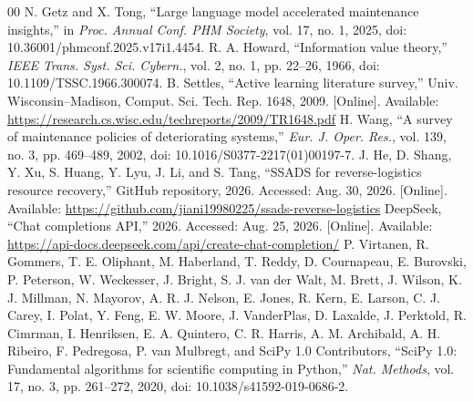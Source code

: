 \documentclass[a4paper,conference]{IEEEtran}
\begin{document}
\begin{thebibliography}{00}
 N. Getz and X. Tong, ``Large language model accelerated maintenance insights,'' in \emph{Proc. Annual Conf. PHM Society}, vol. 17, no. 1, 2025, doi: 10.36001/phmconf.2025.v17i1.4454.
 R. A. Howard, ``Information value theory,'' \emph{IEEE Trans. Syst. Sci. Cybern.}, vol. 2, no. 1, pp. 22--26, 1966, doi: 10.1109/TSSC.1966.300074.
 B. Settles, ``Active learning literature survey,'' Univ. Wisconsin--Madison, Comput. Sci. Tech. Rep. 1648, 2009. [Online]. Available: \url{https://research.cs.wisc.edu/techreports/2009/TR1648.pdf}
 H. Wang, ``A survey of maintenance policies of deteriorating systems,'' \emph{Eur. J. Oper. Res.}, vol. 139, no. 3, pp. 469--489, 2002, doi: 10.1016/S0377-2217(01)00197-7.
 J. He, D. Shang, Y. Xu, S. Huang, Y. Lyu, J. Li, and S. Tang, ``SSADS for reverse-logistics resource recovery,'' GitHub repository, 2026. Accessed: Aug. 30, 2026. [Online]. Available: \url{https://github.com/jiani19980225/ssads-reverse-logistics}
 DeepSeek, ``Chat completions API,'' 2026. Accessed: Aug. 25, 2026. [Online]. Available: \url{https://api-docs.deepseek.com/api/create-chat-completion/}
 P. Virtanen, R. Gommers, T. E. Oliphant, M. Haberland, T. Reddy, D. Cournapeau, E. Burovski, P. Peterson, W. Weckesser, J. Bright, S. J. van der Walt, M. Brett, J. Wilson, K. J. Millman, N. Mayorov, A. R. J. Nelson, E. Jones, R. Kern, E. Larson, C. J. Carey, I. Polat, Y. Feng, E. W. Moore, J. VanderPlas, D. Laxalde, J. Perktold, R. Cimrman, I. Henriksen, E. A. Quintero, C. R. Harris, A. M. Archibald, A. H. Ribeiro, F. Pedregosa, P. van Mulbregt, and SciPy 1.0 Contributors, ``SciPy 1.0: Fundamental algorithms for scientific computing in Python,'' \emph{Nat. Methods}, vol. 17, no. 3, pp. 261--272, 2020, doi: 10.1038/s41592-019-0686-2.
\end{thebibliography}
\end{document}
